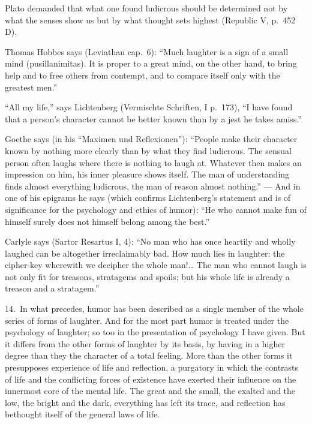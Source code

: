 \documentclass[12pt]{book}
\newcommand{\opage}[1]{\marginnote{\footnotesize\textit{[#1]}}}
\begin{document}
Plato demanded that what one found ludicrous should be determined not by what the
senses show us but by what thought sets highest (Republic V, p.~452 D). %

Thomas Hobbes says (Leviathan cap.~6): ``Much laughter is a sign of a small mind
(pusillanimitas). It is proper to a great mind, on the other hand, to bring help
and to free others from contempt, and to compare itself only with the greatest
men.''

``All my life,'' says Lichtenberg (Vermischte Schriften, I p.~173), ``I have found
that a person's character cannot be better known than by a jest he takes amiss.''

Goethe says (in his ``Maximen und Reflexionen''): ``People make their character
known by nothing more clearly than by what they find ludicrous. The sensual person
often laughs where there is nothing to laugh at. Whatever then makes an impression
on him, his inner pleasure shows itself. The man of understanding finds almost
everything ludicrous, the man of reason almost nothing.'' --- And in one of his
epigrams he says (which confirms Lichtenberg's statement and is of significance for
the psychology and ethics of humor): ``He who cannot make fun of himself surely does
not himself belong among the best.''

Carlyle says (Sartor Resartus I, 4): ``No man who has once heartily and wholly
laughed can be altogether irreclaimably bad. \opage{56}How much lies in laughter:
the cipher-key wherewith we decipher the whole man!\dots{} The man who cannot laugh
is not only fit for treasons, stratagems and spoils; but his whole life is already
a treason and a stratagem.'' %

14.~In what precedes, humor has been described as a single member of the whole
series of forms of laughter. And for the most part humor is treated under the
psychology of laughter; so too in the presentation of psychology I have given. But
it differs from the other forms of laughter by its basis, by having in a higher
degree than they the character of a total feeling. More than the other forms it
presupposes experience of life and reflection, a purgatory in which the contrasts
of life and the conflicting forces of existence have exerted their influence on
the innermost core of the mental life. The great and the small, the exalted and
the low, the bright and the dark, everything has left its trace, and reflection
has bethought itself of the general laws of life.
\end{document}
